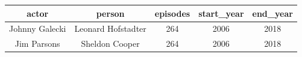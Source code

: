 \documentclass[]{book}
\theoremstyle{definition}
\theoremstyle{definition}
\theoremstyle{definition}
\theoremstyle{remark}
\begin{document}
\begin{longtable}[]{@{}ccccc@{}}
\toprule
\begin{minipage}[b]{0.22\columnwidth}\centering\strut
actor\strut
\end{minipage} & \begin{minipage}[b]{0.28\columnwidth}\centering\strut
person\strut
\end{minipage} & \begin{minipage}[b]{0.12\columnwidth}\centering\strut
episodes\strut
\end{minipage} & \begin{minipage}[b]{0.14\columnwidth}\centering\strut
start\_year\strut
\end{minipage} & \begin{minipage}[b]{0.11\columnwidth}\centering\strut
end\_year\strut
\end{minipage}\tabularnewline
\midrule
\endhead
\begin{minipage}[t]{0.22\columnwidth}\centering\strut
Johnny Galecki\strut
\end{minipage} & \begin{minipage}[t]{0.28\columnwidth}\centering\strut
Leonard Hofstadter\strut
\end{minipage} & \begin{minipage}[t]{0.12\columnwidth}\centering\strut
264\strut
\end{minipage} & \begin{minipage}[t]{0.14\columnwidth}\centering\strut
2006\strut
\end{minipage} & \begin{minipage}[t]{0.11\columnwidth}\centering\strut
2018\strut
\end{minipage}\tabularnewline
\begin{minipage}[t]{0.22\columnwidth}\centering\strut
Jim Parsons\strut
\end{minipage} & \begin{minipage}[t]{0.28\columnwidth}\centering\strut
Sheldon Cooper\strut
\end{minipage} & \begin{minipage}[t]{0.12\columnwidth}\centering\strut
264\strut
\end{minipage} & \begin{minipage}[t]{0.14\columnwidth}\centering\strut
2006\strut
\end{minipage} & \begin{minipage}[t]{0.11\columnwidth}\centering\strut
2018\strut
\end{minipage}\tabularnewline

\end{longtable}
\end{document}
